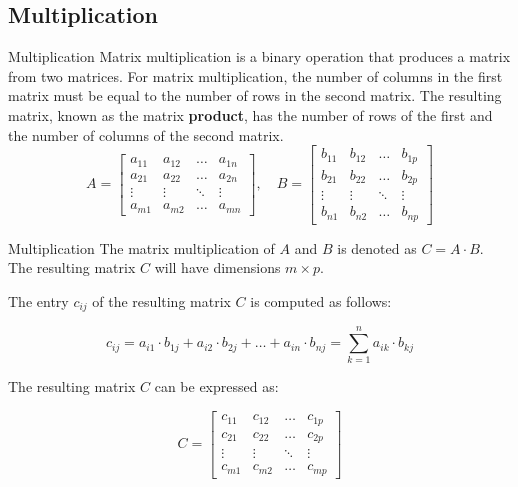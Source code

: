 \documentclass{beamer}
\begin{document}
\subsection{Multiplication}
\begin{frame}{Multiplication}
    \alert{Matrix multiplication} is a binary operation that produces a matrix from two matrices. For matrix multiplication, the number of columns in the first matrix must be equal to the number of rows in the second matrix. The resulting matrix, known as the matrix \textbf{product}, has the number of rows of the first and the number of columns of the second matrix.
    $$
        A = \begin{bmatrix}
            a_{11} & a_{12} & \dots  & a_{1n} \\
            a_{21} & a_{22} & \dots  & a_{2n} \\
            \vdots & \vdots & \ddots & \vdots \\
            a_{m1} & a_{m2} & \dots  & a_{mn}
        \end{bmatrix}, \quad
        B = \begin{bmatrix}
            b_{11} & b_{12} & \dots  & b_{1p} \\
            b_{21} & b_{22} & \dots  & b_{2p} \\
            \vdots & \vdots & \ddots & \vdots \\
            b_{n1} & b_{n2} & \dots  & b_{np}
        \end{bmatrix}
    $$
\end{frame}

\begin{frame}{Multiplication}
    The matrix multiplication of $A$ and $B$ is denoted as $C = A \cdot B$. The resulting matrix $C$ will have dimensions $m \times p$.

    The entry $c_{ij}$ of the resulting matrix $C$ is computed as follows:

    $$
        c_{ij} = a_{i1} \cdot b_{1j} + a_{i2} \cdot b_{2j} + \dots + a_{in} \cdot b_{nj} = \sum_{k=1}^{n} a_{ik} \cdot b_{kj}
    $$

    The resulting matrix $C$ can be expressed as:

    $$
        C = \begin{bmatrix}
            c_{11} & c_{12} & \dots  & c_{1p} \\
            c_{21} & c_{22} & \dots  & c_{2p} \\
            \vdots & \vdots & \ddots & \vdots \\
            c_{m1} & c_{m2} & \dots  & c_{mp}
        \end{bmatrix}
    $$
\end{frame}
\end{document}
